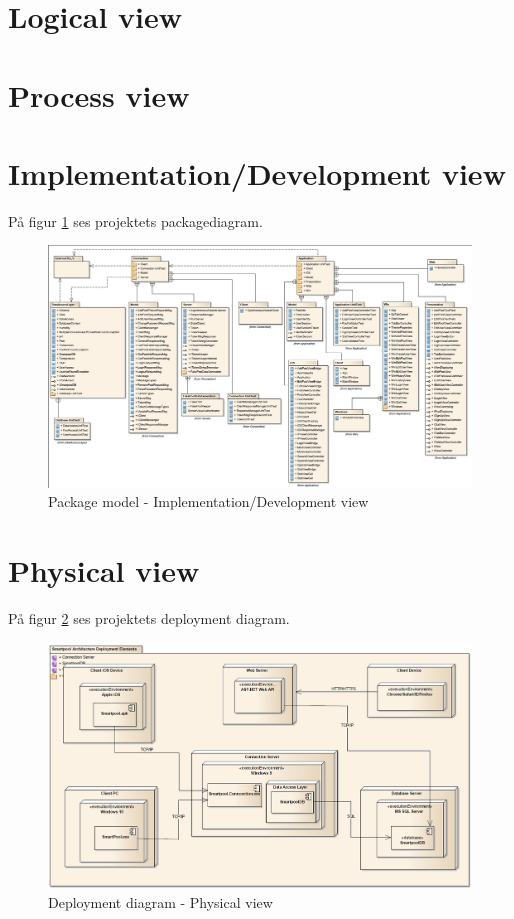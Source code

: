 \section{Logical view}

\section{Process view}

\section{Implementation/Development view}

På figur \ref{fig:packageDiagram} ses projektets packagediagram.

\begin{landscape}
	\begin{figure}[H]
		\centering
		\includegraphics[width=\linewidth]{figs/arkitektur/packageDiagram.PNG}
		\caption{Package model - Implementation/Development view}
		\label{fig:packageDiagram}
	\end{figure}
\end{landscape}

\section{Physical view}

På figur \ref{fig:deploymentView} ses projektets deployment diagram.
\begin{figure}
	\centering
	\includegraphics[width=\linewidth]{figs/arkitektur/deploymentView.PNG}
	\caption{Deployment diagram - Physical view}
	\label{fig:deploymentView}
\end{figure}


